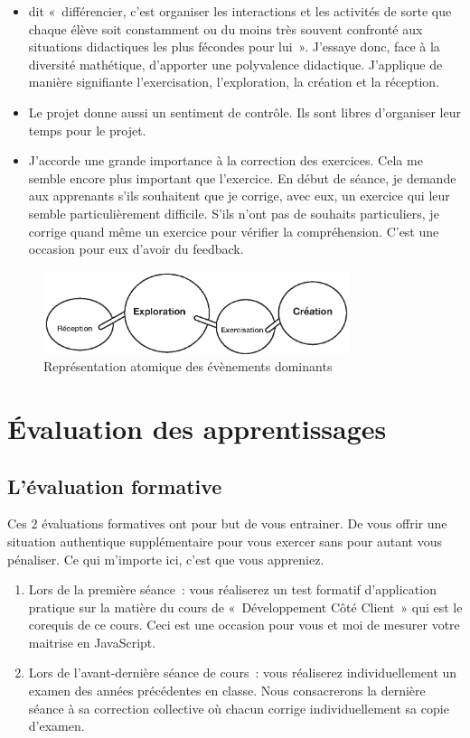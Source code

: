 \begin{itemize}
    \item \citet{perrenoud1992differenciation} dit «~différencier, c’est organiser les interactions et les activités de sorte que chaque élève soit constamment ou du moins très souvent confronté aux situations didactiques les plus fécondes pour lui~». J’essaye donc, face à la diversité mathétique, d’apporter une polyvalence didactique. J'applique de manière signifiante l'exercisation, l'exploration, la création et la réception.
    \item Le projet donne aussi un sentiment de contrôle. Ils sont libres d'organiser leur temps pour le projet.
    \item J'accorde une grande importance à la correction des exercices. Cela me semble encore plus important que l'exercice. En début de séance, je demande aux apprenants s'ils souhaitent que je corrige, avec eux, un exercice qui leur semble particulièrement difficile. S’ils n’ont pas de souhaits particuliers, je corrige quand même un exercice pour vérifier la compréhension. C'est une occasion pour eux d’avoir du feedback.
\end{itemize}
\begin{figure}[H]
    \begin{center}
        \includegraphics[width=0.8\textwidth]{figures/EAEs.eps}
        \caption{Représentation atomique des évènements dominants \cite{leclercq2008modele}}
    \end{center}
\end{figure}
\clearpage

\section{Évaluation des apprentissages}

\subsection{L’évaluation formative}
\label{eval_formative}

Ces 2 évaluations formatives ont pour but de vous entrainer. De vous offrir une situation authentique supplémentaire pour vous exercer sans pour autant vous pénaliser. Ce qui m'importe ici, c'est que vous appreniez.
\begin{enumerate}
    \item Lors de la première séance~: vous réaliserez un test formatif d’application pratique sur la matière du cours de «~Développement Côté Client~» qui est le corequis de ce cours. Ceci est une occasion pour vous et moi de mesurer votre maitrise en JavaScript.
    \item Lors de l'avant-dernière séance de cours~: vous réaliserez individuellement un examen des années précédentes en classe. Nous consacrerons la dernière séance à sa correction collective où chacun corrige individuellement sa copie d'examen.
\end{enumerate}

